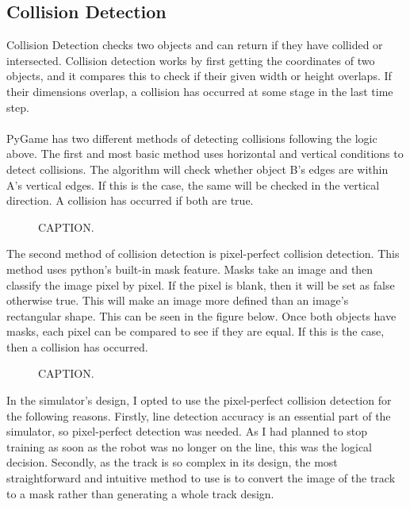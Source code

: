 \documentclass[a4paper,11pt]{article}
\begin{document}
\subsection{Collision Detection}
Collision Detection checks two objects and can return if they have collided or intersected. Collision detection works by first getting the coordinates of two objects, and it compares this to check if their given width or height overlaps. If their dimensions overlap, a collision has occurred at some stage in the last time step.
\\\\
PyGame has two different methods of detecting collisions following the logic above. The first and most basic method uses horizontal and vertical conditions to detect collisions. The algorithm will check whether object B's edges are within A's vertical edges. If this is the case, the same will be checked in the vertical direction. A collision has occurred if both are true.

 \begin{figure}[H]
 \label{fig:}
 \centering
 \caption{CAPTION.}
 \end{figure}


The second method of collision detection is pixel-perfect collision detection. This method uses python's built-in mask feature. Masks take an image and then classify the image pixel by pixel. If the pixel is blank, then it will be set as false otherwise true. This will make an image more defined than an image’s rectangular shape. This can be seen in the figure below. Once both objects have masks, each pixel can be compared to see if they are equal. If this is the case, then a collision has occurred.


 \begin{figure}[H]
 \label{fig:}
 \centering
 \caption{CAPTION.}
 \end{figure}

In the simulator's design, I opted to use the pixel-perfect collision detection for the following reasons. Firstly, line detection accuracy is an essential part of the simulator, so pixel-perfect detection was needed. As I had planned to stop training as soon as the robot was no longer on the line, this was the logical decision. Secondly, as the track is so complex in its design, the most straightforward and intuitive method to use is to convert the image of the track to a mask rather than generating a whole track design.
\end{document}
